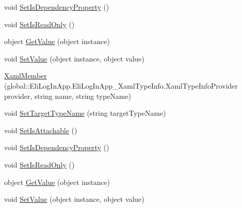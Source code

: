 \begin{DoxyCompactItemize}
void \hyperlink{class_eli_log_in_app_1_1_eli_log_in_app___xaml_type_info_1_1_xaml_member_ac40782344478059194f10f11f88c3fbe}{Set\+Is\+Dependency\+Property} ()
\item 
void \hyperlink{class_eli_log_in_app_1_1_eli_log_in_app___xaml_type_info_1_1_xaml_member_a5f2fce3ca44cf6a8033fdc8bea90b840}{Set\+Is\+Read\+Only} ()
\item 
object \hyperlink{class_eli_log_in_app_1_1_eli_log_in_app___xaml_type_info_1_1_xaml_member_ac213f6e122460781e69a532b26747ab7}{Get\+Value} (object instance)
\item 
void \hyperlink{class_eli_log_in_app_1_1_eli_log_in_app___xaml_type_info_1_1_xaml_member_afcaffc2f62e57fae06da1614f5e13a3c}{Set\+Value} (object instance, object value)
\item 
\hyperlink{class_eli_log_in_app_1_1_eli_log_in_app___xaml_type_info_1_1_xaml_member_a8abdb999c007e272946172e1027e0a57}{Xaml\+Member} (global\+::\+Eli\+Log\+In\+App.\+Eli\+Log\+In\+App\+\_\+\+Xaml\+Type\+Info.\+Xaml\+Type\+Info\+Provider provider, string name, string type\+Name)
\item 
void \hyperlink{class_eli_log_in_app_1_1_eli_log_in_app___xaml_type_info_1_1_xaml_member_a6d5d8f0c1ce0db9c720c9ad536569d21}{Set\+Target\+Type\+Name} (string target\+Type\+Name)
\item 
void \hyperlink{class_eli_log_in_app_1_1_eli_log_in_app___xaml_type_info_1_1_xaml_member_a8b4716c7c6399dcd07c3171a25801c5a}{Set\+Is\+Attachable} ()
\item 
void \hyperlink{class_eli_log_in_app_1_1_eli_log_in_app___xaml_type_info_1_1_xaml_member_ac40782344478059194f10f11f88c3fbe}{Set\+Is\+Dependency\+Property} ()
\item 
void \hyperlink{class_eli_log_in_app_1_1_eli_log_in_app___xaml_type_info_1_1_xaml_member_a5f2fce3ca44cf6a8033fdc8bea90b840}{Set\+Is\+Read\+Only} ()
\item 
object \hyperlink{class_eli_log_in_app_1_1_eli_log_in_app___xaml_type_info_1_1_xaml_member_ac213f6e122460781e69a532b26747ab7}{Get\+Value} (object instance)
\item 
void \hyperlink{class_eli_log_in_app_1_1_eli_log_in_app___xaml_type_info_1_1_xaml_member_afcaffc2f62e57fae06da1614f5e13a3c}{Set\+Value} (object instance, object value)
\end{DoxyCompactItemize}
